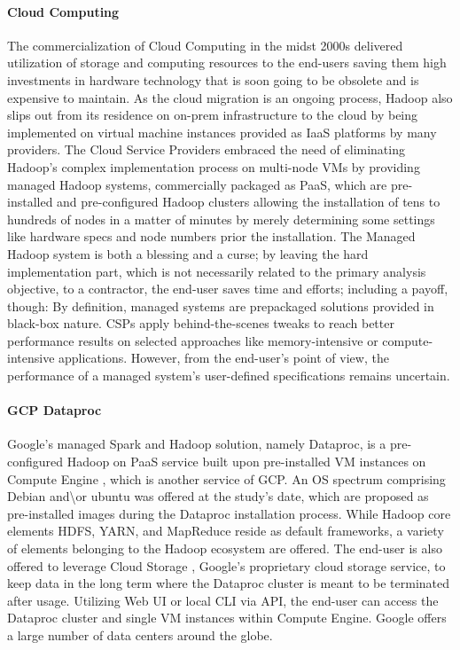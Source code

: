 \documentclass[review]{elsarticle}
\begin{document}
\paragraph{Cloud Computing}The commercialization of Cloud Computing in the midst 2000s \cite{noauthor_announcing_nodate} delivered utilization of storage and computing resources to the end-users saving them high investments in hardware technology that is soon going to be obsolete and is expensive to maintain. As the cloud migration is an ongoing process, Hadoop also slips out from its residence on on-prem infrastructure to the cloud by being implemented on virtual machine instances provided as IaaS platforms by many providers. The Cloud Service Providers embraced the need of eliminating Hadoop's complex implementation process on multi-node VMs by providing managed Hadoop systems, commercially packaged as PaaS, which are pre-installed and pre-configured Hadoop clusters allowing the installation of tens to hundreds of nodes in a matter of minutes by merely determining some settings like hardware specs and node numbers prior the installation. The Managed Hadoop system is both a blessing and a curse; by leaving the hard implementation part, which is not necessarily related to the primary analysis objective, to a contractor, the end-user saves time and efforts; including a payoff, though: By definition, managed systems are prepackaged solutions provided in black-box nature. CSPs apply behind-the-scenes tweaks to reach better performance results on selected approaches like memory-intensive or compute-intensive applications. However, from the end-user's point of view, the performance of a managed system's user-defined specifications remains uncertain.

\paragraph{GCP Dataproc \cite{noauthor_dataproc_nodate}} Google's managed Spark and Hadoop solution, namely Dataproc, is a pre-configured Hadoop on PaaS service built upon pre-installed VM instances on Compute Engine \cite{noauthor_compute_nodate}, which is another service of GCP. An OS spectrum comprising Debian and\textbackslash{or} ubuntu was offered at the study's date, which are proposed as pre-installed images during the Dataproc installation process. While Hadoop core elements HDFS, YARN, and MapReduce reside as default frameworks, a variety of elements belonging to the Hadoop ecosystem are offered. The end-user is also offered to leverage Cloud Storage \cite{noauthor_cloud_nodate}, Google's proprietary cloud storage service, to keep data in the long term where the Dataproc cluster is meant to be terminated after usage. Utilizing Web UI or local CLI via API, the end-user can access the Dataproc cluster and single VM instances within Compute Engine. Google offers a large number of data centers around the globe.
\end{document}
